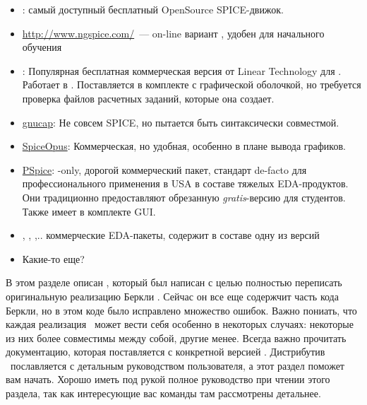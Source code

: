 \begin{itemize}
\item \href{http://ngspice.sourceforge.net/}{\ngs}: самый доступный
бесплатный OpenSource SPICE-движок.
\item \url{http://www.ngspice.com/}\ --- on-line вариант , удобен
для начального обучения
\item \href{http://www.linear.com/designtools/software/}{\lts}:
Популярная бесплатная коммерческая версия от Linear Technology для \win.
Работает в . Поставляется в комплекте с графической оболочкой,
но требуется проверка файлов расчетных заданий, которые она создает.
\item 
\href{https://www.gnu.org/software/gnucap/}{gnucap}:
Не совсем SPICE, но пытается быть синтаксически совместмой.
\item \href{http://www.spiceopus.si/}{SpiceOpus}: Коммерческая, но
удобная, особенно в плане вывода графиков.
\item
\href{http://www.cadence.com/products/orcad/pspice_simulation/Pages/default.aspx}{PSpice}:
\win-only, дорогой коммерческий пакет, стандарт de-facto для
профессионального применения в USA в составе тяжелых EDA-продуктов.
Они традиционно предоставляют обрезанную \emph{gratis}-версию для студентов.
Также имеет в комплекте GUI.
\item {}, , ,.. коммерческие
EDA-пакеты, содержит в составе одну из версий 
\item Какие-то еще?
\end{itemize}

В этом разделе описан \ngs, который был написан с целью полностью переписать
оригинальную реализацию Беркли \spice. Сейчас он все еще содержчит часть кода
Беркли, но в этом коде было исправлено множество ошибок.
Важно пониать, что каждая реализация \spice\ может вести себя особенно в
некоторых случаях: некоторые из них более совместимы между собой, другие менее.
Всегда важно прочитать документацию, которая поставляется с конкретной
версией \spice. Дистрибутив \ngs\ пославляется с детальным руководством
пользователя, а этот раздел поможет вам начать. Хорошо иметь под рукой полное
руководство при чтении этого раздела, так как интересующие вас команды там
рассмотрены детальнее.



